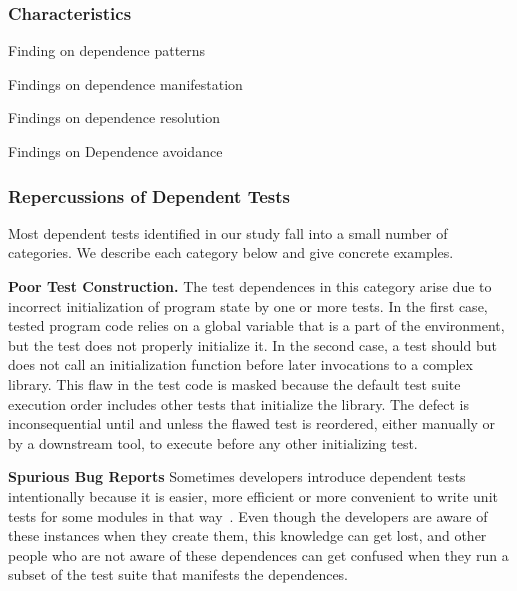 \subsubsection{Characteristics}

Finding on dependence patterns

Findings on dependence manifestation

Findings on dependence resolution

Findings on Dependence avoidance



\subsubsection{Repercussions of Dependent Tests}

Most dependent tests identified in our study fall into a small
number of categories. We describe each category below and give
concrete examples. 

\vspace{1mm}

\noindent \textbf{Poor Test Construction.}
The test dependences in this category arise due to incorrect initialization
of program state by one or more tests. In the first case,
tested program code relies on a
global variable that is a part of the environment, but the test does
not properly initialize it.  In the second case, a test should but
does not call
an initialization function before later invocations to a complex library.
This flaw in the test code is masked because the default test suite execution
order includes other tests that initialize the library.  The defect is
inconsequential until and unless the flawed test is reordered, either manually or by
a downstream tool, to execute before any other initializing test.

\vspace{1mm}

\noindent \textbf{Spurious Bug Reports}
Sometimes developers introduce dependent tests intentionally because it is
easier, more efficient or more convenient to write unit tests for some modules
in that way~\cite{kapfhammeretal:FSE:2003, whittakeretal:2012}.
Even though the developers are aware of these instances
when they create them, this knowledge can get lost, 
and other people who are not aware of these dependences can get confused 
when they run a subset of the test suite that manifests the
dependences.

